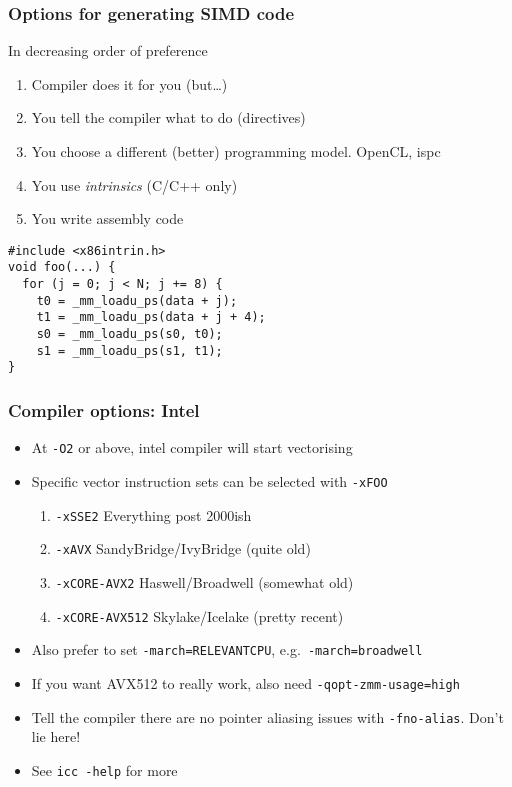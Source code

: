 \documentclass[presentation,aspectratio=43,10pt]{beamer}
\begin{document}
\begin{frame}[fragile]
  \frametitle{Options for generating SIMD code}
  \begin{answer}{In decreasing order of preference}
    \begin{enumerate}
    \item Compiler does it for you (but\dots)
    \item You tell the compiler what to do (directives)
    \item You choose a different (better) programming model. OpenCL,
      ispc
    \item You use \emph{intrinsics} (C/C++ only)
    \item You write assembly code
    \end{enumerate}
  \end{answer}

\begin{verbatim}
#include <x86intrin.h>
void foo(...) {
  for (j = 0; j < N; j += 8) {
    t0 = _mm_loadu_ps(data + j);
    t1 = _mm_loadu_ps(data + j + 4);
    s0 = _mm_loadu_ps(s0, t0);
    s1 = _mm_loadu_ps(s1, t1);
}
\end{verbatim}
\end{frame}

\begin{frame}
  \frametitle{Compiler options: Intel}
  \begin{itemize}
  \item At \texttt{-O2} or above, intel compiler will start
    vectorising
  \item Specific vector instruction sets can be selected with
    \texttt{-xFOO}
    \begin{enumerate}
    \item \texttt{-xSSE2} Everything post 2000ish

    \item \texttt{-xAVX} SandyBridge/IvyBridge (quite old)

    \item \texttt{-xCORE-AVX2} Haswell/Broadwell (somewhat old)
    \item \texttt{-xCORE-AVX512} Skylake/Icelake (pretty recent)
    \end{enumerate}
  \item Also prefer to set \texttt{-march=RELEVANTCPU},
    e.g.~\texttt{-march=broadwell}
  \item If you want AVX512 to really work, also need
    \texttt{-qopt-zmm-usage=high}
  \item Tell the compiler there are no pointer aliasing issues with
    \texttt{-fno-alias}. Don't lie here!
  \item See \texttt{icc -help} for more
  \end{itemize}
\end{frame}
\end{document}
